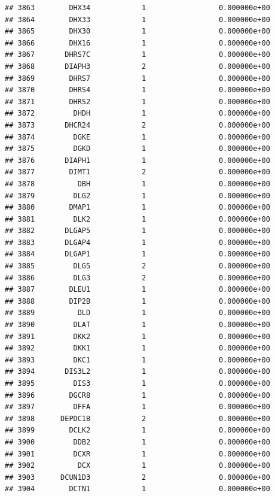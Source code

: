 \documentclass[
]{article}
\begin{document}
\begin{verbatim}
## 3863        DHX34            1                 0.000000e+00
## 3864        DHX33            1                 0.000000e+00
## 3865        DHX30            1                 0.000000e+00
## 3866        DHX16            1                 0.000000e+00
## 3867       DHRS7C            1                 0.000000e+00
## 3868       DIAPH3            2                 0.000000e+00
## 3869        DHRS7            1                 0.000000e+00
## 3870        DHRS4            1                 0.000000e+00
## 3871        DHRS2            1                 0.000000e+00
## 3872         DHDH            1                 0.000000e+00
## 3873       DHCR24            2                 0.000000e+00
## 3874         DGKE            1                 0.000000e+00
## 3875         DGKD            1                 0.000000e+00
## 3876       DIAPH1            1                 0.000000e+00
## 3877        DIMT1            2                 0.000000e+00
## 3878          DBH            1                 0.000000e+00
## 3879         DLG2            1                 0.000000e+00
## 3880        DMAP1            1                 0.000000e+00
## 3881         DLK2            1                 0.000000e+00
## 3882       DLGAP5            1                 0.000000e+00
## 3883       DLGAP4            1                 0.000000e+00
## 3884       DLGAP1            1                 0.000000e+00
## 3885         DLG5            2                 0.000000e+00
## 3886         DLG3            2                 0.000000e+00
## 3887        DLEU1            1                 0.000000e+00
## 3888        DIP2B            1                 0.000000e+00
## 3889          DLD            1                 0.000000e+00
## 3890         DLAT            1                 0.000000e+00
## 3891         DKK2            1                 0.000000e+00
## 3892         DKK1            1                 0.000000e+00
## 3893         DKC1            1                 0.000000e+00
## 3894       DIS3L2            1                 0.000000e+00
## 3895         DIS3            1                 0.000000e+00
## 3896        DGCR8            1                 0.000000e+00
## 3897         DFFA            1                 0.000000e+00
## 3898      DEPDC1B            2                 0.000000e+00
## 3899        DCLK2            1                 0.000000e+00
## 3900         DDB2            1                 0.000000e+00
## 3901         DCXR            1                 0.000000e+00
## 3902          DCX            1                 0.000000e+00
## 3903      DCUN1D3            2                 0.000000e+00
## 3904        DCTN1            1                 0.000000e+00

\end{verbatim}
\end{document}
